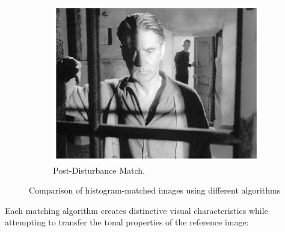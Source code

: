 \documentclass[12pt,a4paper]{article}
\begin{document}
\begin{figure}[H]
\begin{subfigure}{0.32\textwidth}
        \includegraphics[width=\textwidth]{results/images/matched_post-disturbance.png}
        \caption{Post-Disturbance Match.}
    \end{subfigure}
    \caption{Comparison of histogram-matched images using different algorithms}
    \label{fig:match_images}
\end{figure}



Each matching algorithm creates distinctive visual characteristics while attempting to transfer the tonal properties of the reference image:
\end{document}
